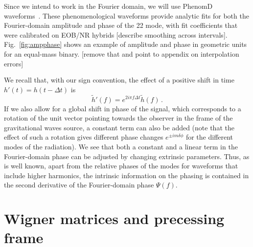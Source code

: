\documentclass[aps,showpacs,twocolumn,
prd,superscriptaddress,nofootinbib]{revtex4-1}
\newcommand{\be}{\begin{equation}}
\newcommand{\ee}{\end{equation}}
\newcommand{\Hz}{\,\mathrm{Hz}}
\newcommand{\SM}[1]{{\color{Red} #1}}
\begin{document}
Since we intend to work in the Fourier domain, we will use PhenomD waveforms~\cite{Khan+15}. These phenomenological waveforms provide analytic fits for both the Fourier-domain amplitude and phase of the 22 mode, with fit coefficients that were calibrated on EOB/NR hybrids [describe smoothing across intervals]. Fig.~\ref{fig:ampphase} shows an example of amplitude and phase in geometric units for an equal-mass binary. \SM{[remove that and point to appendix on interpolation errors]}


We recall that, with our sign convention, the effect of a positive shift in time $h' (t) = h(t- \Delta t)$ is
\be
	\tilde{h}'(f) = e^{2i\pi f \Delta t} \tilde{h}(f) \,.
\ee
If we also allow for a global shift in phase of the signal, which corresponds to a rotation of the unit vector pointing towards the observer in the frame of the gravitational waves source, a constant term can also be added (note that the effect of such a rotation gives different phase changes $e^{\pm i m \delta \phi}$ for the different modes of the radiation). We see that both a constant and a linear term in the Fourier-domain phase can be adjusted by changing extrinsic parameters. Thus, as is well known, apart from the relative phases of the modes for waveforms that include higher harmonics, the intrinsic information on the phasing is contained in the second derivative of the Fourier-domain phase $\Psi(f)$.


\section{Wigner matrices and precessing frame}
\label{app:wigner}
\end{document}
